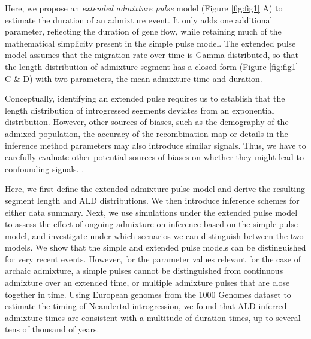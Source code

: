 \documentclass[]{article}
\begin{document}
Here, we propose an \emph{extended admixture pulse} model (Figure \ref{fig:fig1} A) to estimate the duration of an admixture event. It only adds one additional parameter, reflecting the duration of gene flow, while retaining much of the mathematical simplicity present in the simple pulse model. 
The extended pulse model assumes that the migration rate over time is Gamma distributed, so that the length distribution of admixture segment has a closed form (Figure \ref{fig:fig1} C \& D) with two parameters, the mean admixture time and duration.

Conceptually, identifying an extended pulse requires us to establish that the length distribution of introgressed segments deviates from an exponential distribution. However, other sources of biases, such as the demography of the admixed population, the accuracy of the recombination map or details in the inference method parameters may also introduce similar signals. Thus, we have to carefully evaluate other potential sources of biases on whether they might lead to confounding signals. \citep{sankararaman_date_2012,fu_genome_2014,moorjani_genetic_2016}. 



Here, we first define the extended admixture pulse model and derive the resulting segment length and ALD distributions. We then introduce inference schemes for either data summary. Next, we use simulations under the extended pulse model to assess the effect of ongoing admixture on inference based on the simple pulse model, and investigate under which scenarios we can distinguish between the two models. We show that the simple and extended pulse models can be distinguished for very recent events. However, for the parameter values relevant for the  case of archaic admixture, a simple pulses cannot be distinguished from continuous admixture  over an extended time, or multiple admixture pulses that are close together in time. Using European genomes from the 1000 Genomes dataset \citep{the_1000_genomes_project_consortium_global_2015} to estimate the timing of Neandertal introgression, we found that ALD inferred admixture times are consistent with a multitude of duration times, up to several tens of thousand of years.
\end{document}
